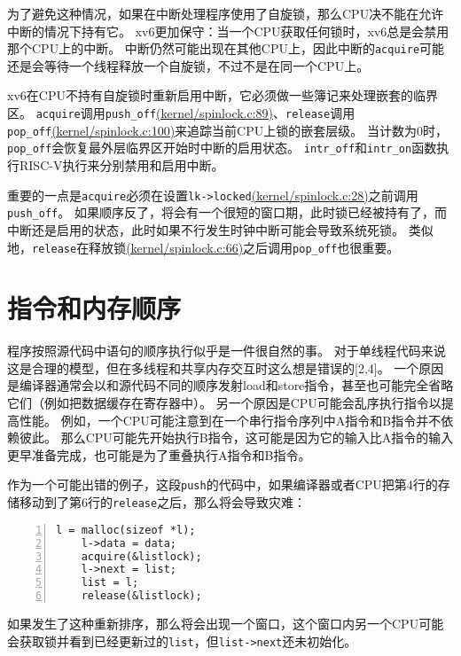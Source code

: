 为了避免这种情况，如果在中断处理程序使用了自旋锁，那么CPU决不能在允许中断的情况下持有它。
xv6更加保守：当一个CPU获取任何锁时，xv6总是会禁用那个CPU上的中断。
中断仍然可能出现在其他CPU上，因此中断的\texttt{acquire}可能还是会等待一个线程释放一个自旋锁，不过不是在同一个CPU上。

xv6在CPU不持有自旋锁时重新启用中断，它必须做一些簿记来处理嵌套的临界区。
\texttt{acquire}调用\texttt{push\_off}\href{https://github.com/mit-pdos/xv6-riscv/blob/risc/kernel/spinlock.c#L89}{(kernel/spinlock.c:89)}、\texttt{release}调用\texttt{pop\_off}\href{https://github.com/mit-pdos/xv6-riscv/blob/risc/kernel/spinlock.c#L100}{(kernel/spinlock.c:100)}来追踪当前CPU上锁的嵌套层级。
当计数为0时，\texttt{pop\_off}会恢复最外层临界区开始时中断的启用状态。
\texttt{intr\_off}和\texttt{intr\_on}函数执行RISC-V执行来分别禁用和启用中断。

重要的一点是\texttt{acquire}必须在设置\texttt{lk->locked}\href{https://github.com/mit-pdos/xv6-riscv/blob/risc/kernel/spinlock.c#L28}{(kernel/spinlock.c:28)}之前调用\texttt{push\_off}。
如果顺序反了，将会有一个很短的窗口期，此时锁已经被持有了，而中断还是启用的状态，此时如果不行发生时钟中断可能会导致系统死锁。
类似地，\texttt{release}在释放锁\href{https://github.com/mit-pdos/xv6-riscv/blob/risc/kernel/spinlock.c#L66}{(kernel/spinlock.c:66)}之后调用\texttt{pop\_off}也很重要。

\section{指令和内存顺序}
程序按照源代码中语句的顺序执行似乎是一件很自然的事。
对于单线程代码来说这是合理的模型，但在多线程和共享内存交互时这么想是错误的[2,4]。
一个原因是编译器通常会以和源代码不同的顺序发射load和store指令，甚至也可能完全省略它们（例如把数据缓存在寄存器中）。
另一个原因是CPU可能会乱序执行指令以提高性能。
例如，一个CPU可能注意到在一个串行指令序列中A指令和B指令并不依赖彼此。
那么CPU可能先开始执行B指令，这可能是因为它的输入比A指令的输入更早准备完成，也可能是为了重叠执行A指令和B指令。

作为一个可能出错的例子，这段\texttt{push}的代码中，如果编译器或者CPU把第4行的存储移动到了第6行的\texttt{release}之后，那么将会导致灾难：
\begin{lstlisting}[numbers=left]
    l = malloc(sizeof *l);
    l->data = data;
    acquire(&listlock);
    l->next = list;
    list = l;
    release(&listlock);
\end{lstlisting}
如果发生了这种重新排序，那么将会出现一个窗口，这个窗口内另一个CPU可能会获取锁并看到已经更新过的\texttt{list}，但\texttt{list->next}还未初始化。

